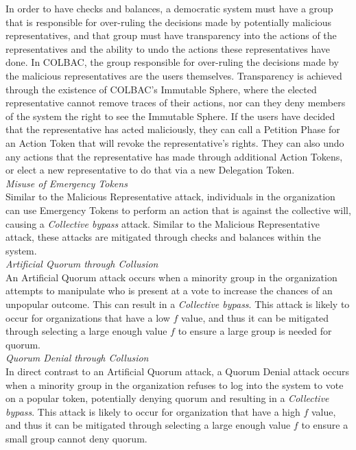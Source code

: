 In order to have checks and balances, a democratic system must have a group that
is responsible for over-ruling the decisions made by potentially malicious
representatives, and that group must have transparency into the actions of the
representatives and the ability to undo the actions these representatives have
done. In COLBAC, the group responsible for over-ruling the decisions made by the
malicious representatives are the users themselves. Transparency is achieved
through the existence of COLBAC's Immutable Sphere, where the elected
representative cannot remove traces of their actions, nor can they deny members
of the system the right to see the Immutable Sphere. If the users have decided
that the representative has acted maliciously, they can call a Petition Phase
for an Action Token that will revoke the representative's rights. They can also
undo any actions that the representative has made through additional Action
Tokens, or elect a new representative to do that via a new Delegation Token.\\

\noindent\textit{Misuse of Emergency Tokens}\mbox{}\\
Similar to the Malicious Representative attack, individuals in the organization
can use Emergency Tokens to perform an action that is against the collective
will, causing a \emph{Collective bypass} attack. Similar to the Malicious
Representative attack, these attacks are mitigated through checks and balances
within the system.\\

\noindent\textit{Artificial Quorum through Collusion}\mbox{}\\
An Artificial Quorum attack occurs when a minority group in the organization
attempts to manipulate who is present at a vote to increase the chances of an
unpopular outcome. This can result in a \emph{Collective bypass}. This attack is
likely to occur for organizations that have a low $f$ value, and thus it can
be mitigated through selecting a large enough value $f$ to ensure a large group
is needed for quorum.\\ 

\noindent\textit{Quorum Denial through Collusion}\mbox{}\\
In direct contrast to an Artificial Quorum attack, a Quorum Denial attack occurs
when a minority group in the organization refuses to log into the system to vote
on a popular token, potentially denying quorum and resulting in a
\emph{Collective bypass}. This attack is likely to occur for organization that
have a high $f$ value, and thus it can be mitigated through selecting a large
enough value $f$ to ensure a small group cannot deny quorum.
    

